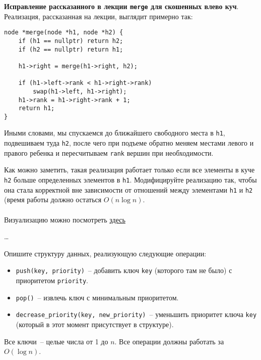 \begin{problem}
    \textbf{Исправление рассказанного в лекции \texttt{merge} для скошенных влево куч}.
    Реализация, рассказанная на лекции, выглядит примерно так:

    {
        \normalfont\begin{lstlisting}
node *merge(node *h1, node *h2) {
    if (h1 == nullptr) return h2;
    if (h2 == nullptr) return h1;

    h1->right = merge(h1->right, h2);

    if (h1->left->rank < h1->right->rank)
        swap(h1->left, h1->right);
    h1->rank = h1->right->rank + 1;
    return h1;
}
        \end{lstlisting}
    }

    Иными словами, мы спускаемся до ближайшего свободного места в \texttt{h1}, подвешиваем туда \texttt{h2}, после чего
    при подъеме обратно меняем местами левого и правого ребенка и пересчитываем \texttt{rank} вершин при необходимости.

    Как можно заметить, такая реализация работает только если все элементы в куче \texttt{h2} больше определенных
    элементов в \texttt{h1}. Модифицируйте реализацию так, чтобы она стала корректной вне зависимости от отношений
    между элементами \texttt{h1} и \texttt{h2} (время работы должно остаться $O(n \log n)$. \\\\
    {\footnotesize Визуализацию можно посмотреть \href{https://www.cs.usfca.edu/~galles/visualization/LeftistHeap.html}{здесь}}
\end{problem}

\begin{solution}
    \dots
\end{solution}


\begin{problem}
    Опишите структуру данных, реализующую следующие операции:
    \begin{itemize}
        \item \texttt{push(key, priority)}~-- добавить ключ \texttt{key} (которого там не было) с приоритетом \texttt{priority}.
        \item \texttt{pop()}~-- извлечь ключ с минимальным приоритетом.
        \item \texttt{decrease\_priority(key, new\_priority)}~-- уменьшить приоритет ключа \texttt{key} (который в этот момент присутствует в структуре).
    \end{itemize}
    Все ключи~-- целые числа от 1 до $n$. Все операции должны работать за $O(\log{n})$.
\end{problem}

